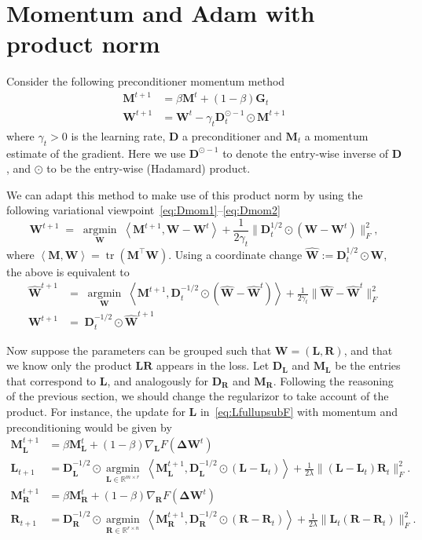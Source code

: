 \documentclass[11pt]{article}
\newcommand{\mat}[1]{\bm{#1}}
\newcommand{\R}{\mathbb{R}}
\newcommand{\mD}{\mat{D}}
\newcommand{\mG}{\mat{G}}
\newcommand{\mL}{\mat{L}}
\newcommand{\mM}{\mat{M}}
\newcommand{\mR}{\mat{R}}
\newcommand{\mW}{\mat{W}}
\newcommand{\DW}{\mat{\Delta W}}
\newcommand{\dotprod}[1]{\left< #1\right>}
\DeclareMathOperator{\argmininn}{argmin}
\newcommand{\argmin}[1]{ \underset{#1}{\argmininn} \;}
\DeclareMathOperator{\traceOp}{tr}
\providecommand{\trace}[1]{\traceOp\left(#1\right)}
\begin{document}
\section{Momentum and Adam with product norm}

Consider the following preconditioner momentum method
\begin{align}
    \mM^{t+1} &= \beta \mM^{t} + (1-\beta)  \mG_t  \label{eq:Dmom1} \\
    \mW^{t+1} & = \mW^t - \gamma_t\mD^{\odot-1}_t \odot \mM^{t+1} \label{eq:Dmom2}
\end{align}
where $\gamma_t>0$ is the learning rate, $\mD$ a preconditioner and $\mM_t$ a momentum estimate of the gradient. Here we use $\mD^{\odot-1}$ to denote the entry-wise inverse of $\mD$, and $\odot$ to be the entry-wise (Hadamard) product.

We can adapt this method 
to make use of this product norm by using the following variational viewpoint~\eqref{eq:Dmom1}--\eqref{eq:Dmom2}
\begin{equation}
    \mW^{t+1} \; = \; \argmin{\mW}  \dotprod{\mM^{t+1}, \mW-\mW^t} + \frac{1}{2\gamma_t} \|\mD_t^{1/2}\odot (\mW-\mW^t) \|_{F}^2, 
\end{equation}
where %
$\dotprod{\mM, \mW} = \trace{\mM^\top \mW}.$ Using a coordinate change $\hat{\mW} := \mD_t^{1/2} \odot \mW$, the above is equivalent to 
\begin{align}
    \hat{\mW}^{t+1} & = \; \argmin{\mW}  \dotprod{\mM^{t+1},\mD_t^{-1/2}\odot( \hat{\mW}-\hat{\mW}^t)} + \frac{1}{2\gamma_t} \| \hat{\mW}-\hat{\mW}^t\|_{F}^2 \\
    \mW^{t+1} & = \;  \mD_t^{-1/2} \odot \hat{\mW}^{t+1}
\end{align}

Now suppose the parameters can be grouped such that $\mW = (\mL, \mR)$, and that we know only the product $\mL\mR$ appears in the loss. Let $\mD_{\mL}$  and $\mM_{\mL}$ be the entries that correspond to $\mL$, and analogously for $\mD_{\mR}$  and $\mM_{\mR}.$ Following the reasoning of the previous section, we should change the regularizor to take account of the product. For instance, the update for $\mL$ in~\eqref{eq:LfullupsubF} with momentum and preconditioning would be given by
    \begin{align}
          \mM^{t+1}_{\mL} &= \beta \mM^{t}_{\mL} + (1-\beta)   \nabla_{\mL} F(\DW^t)  \nonumber \\
 \mL_{t+1} &=  \mD_{\mL}^{-1/2} \odot \argmin{\mL \in \R^{m \times r}}   \dotprod{\mM_{\mL}^{t+1}, \mD_{\mL}^{-1/2}\odot(\mL-\mL_t)} + \frac{1}{2\lambda} \|(\mL-\mL_t)\mR_t\|_F^2.\label{eq:Lprecond}  \\
     \mM^{t+1}_{\mR} &= \beta \mM^{t}_{\mR} + (1-\beta)   \nabla_{\mR} F(\DW^t)  \nonumber   \\
     \mR_{t+1} &=  \mD_{\mR}^{-1/2} \odot \argmin{\mR \in \R^{r \times n}}   \dotprod{\mM_{\mR}^{t+1}, \mD_{\mR}^{-1/2}\odot(\mR-\mR_t)} + \frac{1}{2\lambda} \|\mL_t(\mR-\mR_t)\|_F^2.\label{eq:Rprecond} 
\end{align}
\end{document}
